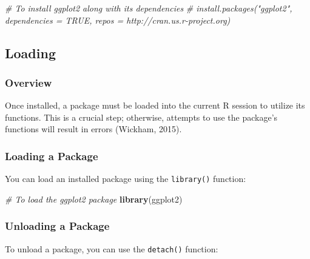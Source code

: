 \documentclass[
]{book}
\newenvironment{Shaded}{\begin{snugshade}}{\end{snugshade}}
\newcommand{\CommentTok}[1]{\textcolor[rgb]{0.56,0.35,0.01}{\textit{#1}}}
\newcommand{\FunctionTok}[1]{\textcolor[rgb]{0.13,0.29,0.53}{\textbf{#1}}}
\newcommand{\NormalTok}[1]{#1}
\begin{document}
\begin{Shaded}
\begin{Highlighting}[]
\CommentTok{\# To install ggplot2 along with its dependencies}
\CommentTok{\# install.packages("ggplot2", dependencies = TRUE, repos = \textquotesingle{}http://cran.us.r{-}project.org\textquotesingle{})}
\end{Highlighting}
\end{Shaded}

\hypertarget{loading}{%
\subsection*{Loading}\label{loading}}

\hypertarget{overview-7}{%
\subsubsection*{Overview}\label{overview-7}}

Once installed, a package must be loaded into the current R session to utilize its functions. This is a crucial step; otherwise, attempts to use the package's functions will result in errors (Wickham, 2015).

\hypertarget{loading-a-package}{%
\subsubsection*{Loading a Package}\label{loading-a-package}}

You can load an installed package using the \texttt{library()} function:

\begin{Shaded}
\begin{Highlighting}[]
\CommentTok{\# To load the ggplot2 package}
\FunctionTok{library}\NormalTok{(ggplot2)}
\end{Highlighting}
\end{Shaded}

\hypertarget{unloading-a-package}{%
\subsubsection*{Unloading a Package}\label{unloading-a-package}}

To unload a package, you can use the \texttt{detach()} function:
\end{document}
